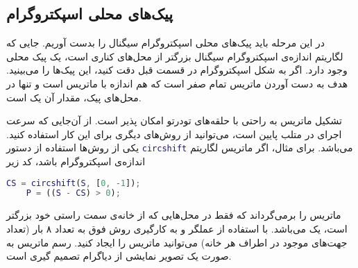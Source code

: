 \documentclass{utsignal}
\begin{document}
	\subsection{پیک‌های محلی اسپکتروگرام}
	در این مرحله باید پیک‌های محلی اسپکتروگرام سیگنال را بدست آوریم. جایی که لگاریتم اندازه‌ی اسپکتروگرام سیگنال بزرگتر از محل‌های کناری است، یک پیک محلی وجود دارد. اگر به شکل اسپکتروگرام در قسمت قبل دقت کنید، این پیک‌ها را می‌بینید. هدف به دست آوردن ماتریس تمام صفر  است که هم اندازه با ماتریس  است و تنها در محل‌های پیک، مقدار آن یک است.
	
	تشکیل ماتریس  به راحتی با حلقه‌های تودرتو امکان پذیر است. از آن‌جایی که سرعت اجرای  در متلب پایین است، می‌توانید از روش‌های دیگری برای این کار استفاده کنید. یکی از روش‌ها استفاده از دستور \lstinline[language=Matlab]{circshift} می‌باشد. برای مثال، اگر  ماتریس لگاریتم اندازه‌ی اسپکتروگرام باشد، کد زیر
	\begin{latin}
		\begin{lstlisting}[language=Matlab]
	CS = circshift(S, [0, -1]);
	P = ((S - CS) > 0);\end{lstlisting}
	\end{latin}
\noindent ماتریس  را برمی‌گرداند که فقط در محل‌هایی که  از خانه‌ی سمت راستی خود بزرگتر است، یک می‌باشد. با استفاده از عملگر \lr{\&} و به کارگیری روش فوق به تعداد ۸ بار (تعداد جهت‌های موجود در اطراف هر خانه) ‌می‌توانید ماتریس  را ایجاد کنید. رسم ماتریس  به صورت یک تصویر نمایشی از دیاگرام تصمیم گیری است.
\end{document}
